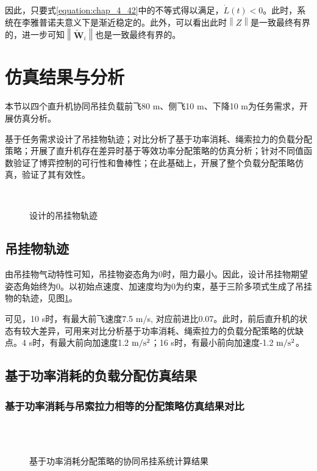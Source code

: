 因此，只要式\ref{equation:chap_4_42}中的不等式得以满足，$\dot L\left( t \right) < 0$。此时，系统在李雅普诺夫意义下是渐近稳定的。此外，可以看出此时$\left\| Z \right\|$是一致最终有界的，进一步可知$\left\| {{{{\mathbf{\tilde W}}}_i}} \right\|$也是一致最终有界的。
\section{仿真结果与分析}
本节以四个直升机协同吊挂负载前飞80 m、侧飞10 m、下降10 m为任务需求，开展仿真分析。

基于任务需求设计了吊挂物轨迹；对比分析了基于功率消耗、绳索拉力的负载分配策略；开展了直升机存在差异时基于等效功率分配策略的仿真分析；针对不同值函数验证了博弈控制的可行性和鲁棒性；在此基础上，开展了整个负载分配策略仿真，验证了其有效性。

\begin{figure}[!htb]  
  \quad
    \\
    \quad
    \caption{设计的吊挂物轨迹}
    \label{fig:chap4_5_1_1}
  \end{figure}
\subsection{吊挂物轨迹}
由吊挂物气动特性可知，吊挂物姿态角为0时，阻力最小。因此，设计吊挂物期望姿态角始终为0。以初始点速度、加速度均为0为约束，基于三阶多项式生成了吊挂物的轨迹，见图\ref{fig:chap4_5_1_1}。

可见，10 s时，有最大前飞速度7.5 m/s, 对应前进比0.07。此时，前后直升机的状态有较大差异，可用来对比分析基于功率消耗、绳索拉力的负载分配策略的优缺点。4 s时，有最大前向加速度1.2 $\rm{m/s^2}$；16 s时，有最小前向加速度-1.2 $\rm{m/s^2}$。
  
\subsection{基于功率消耗的负载分配仿真结果}
\subsubsection{基于功率消耗与吊索拉力相等的分配策略仿真结果对比}
\begin{figure}[!htb]
  \quad
  \\
  \quad
  \\
  \quad
  \caption{基于功率消耗分配策略的协同吊挂系统计算结果}
  \label{fig:chap4_5_2_1}
\end{figure}

